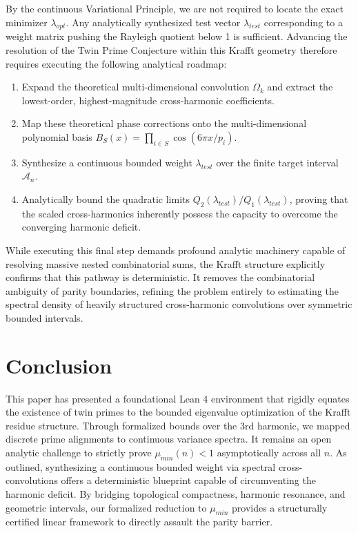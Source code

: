 \documentclass[lean]{AFM}
\renewcommand{\.}{\hskip .75pt}
\begin{document}
By the continuous Variational Principle, we are not required to locate the exact minimizer
$\lambda_{opt}$. Any analytically synthesized test vector $\lambda_{test}$ corresponding to a
weight matrix pushing the Rayleigh quotient below 1 is sufficient. Advancing the resolution of
the Twin Prime Conjecture within this Krafft geometry therefore requires executing the following
analytical roadmap:

\begin{enumerate}
\item Expand the theoretical multi-dimensional convolution $\Omega_k$ and extract the lowest-order,
highest-magnitude cross-harmonic coefficients.
\item Map these theoretical phase corrections onto the multi-dimensional polynomial basis
$B_S(x) = \prod_{i \in S} \cos(6\pi x/p_i)$.
\item Synthesize a continuous bounded weight $\lambda_{test}$ over the finite target interval
$\mathcal{A}_n$.
\item Analytically bound the quadratic limits $Q_2(\lambda_{test}) / Q_1(\lambda_{test})$, proving
that the scaled cross-harmonics inherently possess the capacity to overcome the converging
harmonic deficit.
\end{enumerate}

While executing this final step demands profound analytic machinery capable of resolving massive
nested combinatorial sums, the Krafft structure explicitly confirms that this pathway is
deterministic. It removes the combinatorial ambiguity of parity boundaries, refining the problem
entirely to estimating the spectral density of heavily structured cross-harmonic convolutions over
symmetric bounded intervals.

\section {Conclusion}

This paper has presented a foundational Lean 4 environment that rigidly equates the existence of
twin primes to the bounded eigenvalue optimization of the Krafft residue structure. Through
formalized bounds over the 3rd harmonic, we mapped discrete prime alignments to continuous
variance spectra. It remains an open analytic challenge to strictly prove $\mu_{min}(n) < 1$
asymptotically across all $n$. As outlined, synthesizing a continuous bounded weight via spectral
cross-convolutions offers a deterministic blueprint capable of circumventing the harmonic deficit.
By bridging topological compactness, harmonic resonance, and geometric intervals, our formalized
reduction to $\mu_{min}$ provides a structurally certified linear framework to directly assault the
parity barrier.
\end{document}
